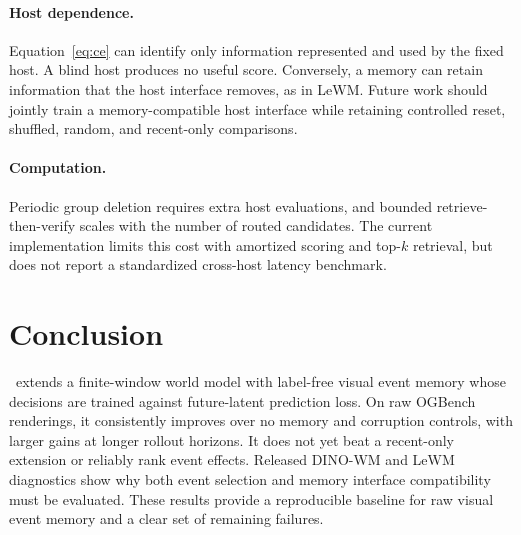 \paragraph{Host dependence.}
Equation~\ref{eq:ce} can identify only information represented and used by the
fixed host. A blind host produces no useful score. Conversely, a memory can
retain information that the host interface removes, as in LeWM. Future work
should jointly train a memory-compatible host interface while retaining
controlled reset, shuffled, random, and recent-only comparisons.

\paragraph{Computation.}
Periodic group deletion requires extra host evaluations, and bounded
retrieve-then-verify scales with the number of routed candidates. The current
implementation limits this cost with amortized scoring and top-$k$ retrieval,
but does not report a standardized cross-host latency benchmark.

\section{Conclusion}

\cem\ extends a finite-window world model with label-free visual event memory
whose decisions are trained against future-latent prediction loss. On raw
OGBench renderings, it consistently improves over no memory and corruption
controls, with larger gains at longer rollout horizons. It does not yet beat a
recent-only extension or reliably rank event effects. Released DINO-WM and
LeWM diagnostics show why both event selection and memory interface
compatibility must be evaluated. These results provide a reproducible baseline
for raw visual event memory and a clear set of remaining failures.
